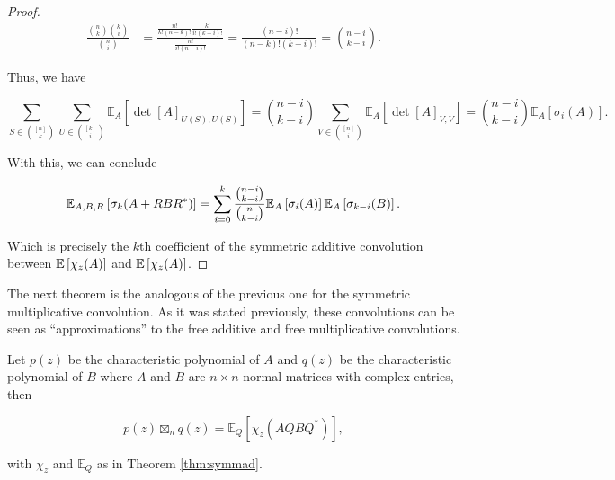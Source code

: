 \begin{proof}
    \begin{align*}
        \frac{\binom{n}{k}\binom{k}{i}}{\binom{n}{i}} &= \frac{\frac{n!}{k!(n-k)!}\frac{k!}{i!(k-i)!}}{\frac{n!}{i!(n-i)!}} = \frac{(n-i)!}{(n-k)!(k-i)!} = \binom{n-i}{k-i}.
    \end{align*}

    Thus, we have

    \begin{equation*}
        \sum_{S\in\binom{[n]}{k}} \sum_{U\in \binom{[k]}{i}}  \mathbb E_A\left[ \det[A]_{U(S),U(S)} \right] = \binom{n-i}{k-i} \sum_{V\in \binom{[n]}{i}} \mathbb E_A\left[ \det[A]_{V,V} \right] = \binom{n-i}{k-i}\mathbb E_A\left[\sigma_{i}(A)\right].
    \end{equation*}

    With this, we can conclude

    \begin{equation*}
        \mathbb E_{A,B,R}\left[ \sigma_k(A + RBR^*) \right] =  \sum_{i=0}^k \frac{\binom{n-i}{k-i}}{\binom{n}{k-i}}\mathbb E_{A} \left[\sigma_i(A)\right] \mathbb E_{A}\left[\sigma_{k-i}(B)\right].
    \end{equation*}

    Which is precisely the $k$th coefficient of the symmetric additive convolution between $\mathbb E \left[ \chi_z(A) \right]$ and $\mathbb E \left[ \chi_z(A) \right]$.

\end{proof}





The next theorem is the analogous of the previous one for the symmetric multiplicative convolution. As it was stated previously, these convolutions can be seen as ``approximations'' to the free additive and free multiplicative convolutions.

\begin{theorem}
    Let $p(z)$ be the characteristic polynomial of $A$ and $q(z)$ be the characteristic polynomial of $B$ where $A$ and $B$ are $n\times n$ normal matrices with complex entries, then 

    \begin{equation*}
        p(z) \boxtimes_n q(z) = \mathbb E_Q \left[ \chi_z (AQBQ^*) \right],
    \end{equation*}

    \noindent with $\chi_z$ and $\mathbb E_Q$ as in Theorem \ref{thm:symmad}.
\end{theorem}

